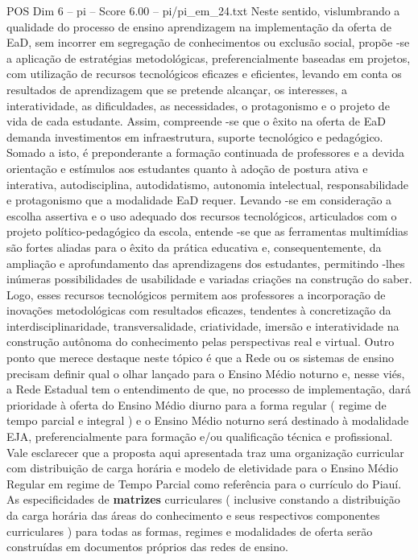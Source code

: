 \begin{textsample}{POS Dim 6 – pi – Score 6.00 – pi/pi\_em\_24.txt}
Neste sentido, vislumbrando a qualidade do processo de ensino aprendizagem na implementação da oferta de EaD, sem incorrer em segregação de conhecimentos ou exclusão social, propõe -se a aplicação de estratégias metodológicas, preferencialmente baseadas em projetos, com utilização de recursos tecnológicos eficazes e eficientes, levando em conta os resultados de aprendizagem que se pretende alcançar, os interesses, a interatividade, as dificuldades, as necessidades, o protagonismo e o projeto de vida de cada estudante.
Assim, compreende -se que o êxito na oferta de EaD demanda investimentos em infraestrutura, suporte tecnológico e pedagógico.
Somado a isto, é preponderante a formação continuada de professores e a devida orientação e estímulos aos estudantes quanto à adoção de postura ativa e interativa, autodisciplina, autodidatismo, autonomia intelectual, responsabilidade e protagonismo que a modalidade EaD requer.
Levando -se em consideração a escolha assertiva e o uso adequado dos recursos tecnológicos, articulados com o projeto político-pedagógico da escola, entende -se que as ferramentas multimídias são fortes aliadas para o êxito da prática educativa e, consequentemente, da ampliação e aprofundamento das aprendizagens dos estudantes, permitindo -lhes inúmeras possibilidades de usabilidade e variadas criações na construção do saber.
Logo, esses recursos tecnológicos permitem aos professores a incorporação de inovações metodológicas com resultados eficazes, tendentes à concretização da interdisciplinaridade, transversalidade, criatividade, imersão e interatividade na construção autônoma do conhecimento pelas perspectivas real e virtual.
Outro ponto que merece destaque neste tópico é que a Rede ou os sistemas de ensino precisam definir qual o olhar lançado para o Ensino Médio noturno e, nesse viés, a Rede Estadual tem o entendimento de que, no processo de implementação, dará prioridade à oferta do Ensino Médio diurno para a forma regular ( regime de tempo parcial e integral ) e o Ensino Médio noturno será destinado à modalidade EJA, preferencialmente para formação e/ou qualificação técnica e profissional.
Vale esclarecer que a proposta aqui apresentada traz uma organização curricular com distribuição de carga horária e modelo de eletividade para o Ensino Médio Regular em regime de Tempo Parcial como referência para o currículo do Piauí.
As especificidades de \textbf{matrizes} curriculares ( inclusive constando a distribuição da carga horária das áreas do conhecimento e seus respectivos componentes curriculares ) para todas as formas, regimes e modalidades de oferta serão construídas em documentos próprios das redes de ensino.

\end{textsample}
